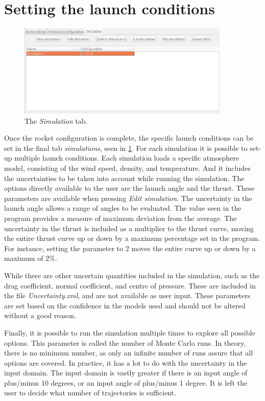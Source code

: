 \documentclass[11pt, a4paper]{article}
\begin{document}
\section{Setting the launch conditions} \label{sec:simulation}

\begin{figure}[]
  \caption{The \emph{Simulation} tab.}
  \label{fig:simulation}
  \centering
    \includegraphics[width=0.9\textwidth]{r-simulation.png}
\end{figure}

Once the rocket configuration is complete, the specific launch conditions can be set in the final tab \emph{simulations}, seen in \cref{fig:simulation}. For each simulation it is possible to set-up multiple launch conditions. Each simulation loads a specific atmosphere model, consisting of the wind speed, density, and temperature. And it includes the uncertainties to be taken into account while running the simulation. The options directly available to the user are the launch angle and the thrust. These parameters are available when pressing \emph{Edit simulation}.
The uncertainty in the launch angle allows a range of angles to be evaluated. The value seen in the program provides a measure of maximum deviation from the average. 
The uncertainty in the thrust is included as a multiplier to the thrust curve, moving the entire thrust curve up or down by a maximum percentage set in the program. For instance, setting the parameter to $2$ moves the entire curve up or down by a maximum of $2\%$.

While there are other uncertain quantities included in the simulation, such as the drag coefficient, normal coefficient, and centre of pressure. These are included in the file \emph{Uncertainty.xml}, and are not available as user input. These parameters are set based on the confidence in the models used and should not be altered without a good reason.

Finally, it is possible to run the simulation multiple times to explore all possible options. This parameter is called the number of Monte Carlo runs. In theory, there is no minimum number, as only an infinite number of runs assure that all options are covered. In practice, it has a lot to do with the uncertainty in the input domain. The input domain is vastly greater if there is an input angle of plus/minus 10 degrees, or an input angle of plus/minus 1 degree. It is left the user to decide what number of trajectories is sufficient.
\end{document}
